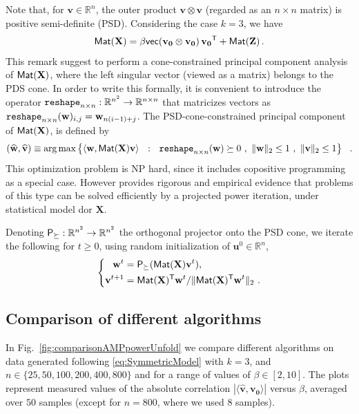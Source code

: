 \documentclass[11pt]{article}
\theoremstyle{definition}
\def\<{\langle}
\def\>{\rangle}
\def\reals{\mathbb{R}}
\def\sT{{\sf T}}
\def\bu{\mathbf{u}}
\def\bv{\mathbf{v}}
\def\hbv{\mathbf{\widehat{v}}}
\def\bw{\mathbf{w}}
\def\hbw{\widehat{\mathbf{w}}}
\def\bvz{\mathbf{v_0}}
\def\bX{\mathbf{X}}
\def\vec{{\sf{vec}}}
\def\bZ{\mathbf{Z}}
\def\M{{\sf Mat}}
\def\P{{\sf P}_\succeq}
\begin{document}
Note that, for $\bv\in\reals^n$, the outer product $\bv \otimes \bv$
(regarded as an $n\times n$ matrix) is positive semi-definite (PSD). 
Considering the case $k=3$, we have
%
\begin{align}
%
\M(\bX) = \beta\vec(\bvz\otimes\bvz)\, \bvz^{\sT} + \M(\bZ)\, .
%
\end{align}
%
This remark suggest to perform a cone-constrained principal component 
analysis of $\M(\bX)$, where the left singular vector (viewed as a
matrix) belongs to the PDS cone.
In order to write this formally, it is convenient to introduce
the operator ${\tt reshape}_{n\times n} : \reals^{n^2} \to \reals^{n
  \times n} $ that matricizes vectors as ${\tt reshape}_{n\times
  n}(\bw)_{i,j} = \bw_{n(i-1) + j}$. The PSD-cone-constrained
principal component of $\M(\bX)$, is defined by 
%
\begin{align}\label{eq:defCCPrincComp}
%
(\hbw,\hbv) \equiv \arg \max \left \{ \< \bw, \M(\bX) \bv \> ~~:~~ {\tt
    reshape}_{n\times n}(\bw)  \succeq 0~,~\|\bw\|_2\leq 1~,~\|\bv\|_2
  \leq 1 \right \}~~.
%
\end{align}
%
This optimization problem is NP hard, since it includes copositive
programming as a special case. However
\cite{deshpande14coneconstrained} provides rigorous and empirical
evidence that problems of this type can be solved efficiently by
a projected power iteration, under statistical model dor $\bX$.

 Denoting $\P : \reals^{n^2} \to \reals^{n^2}$ the orthogonal
 projector  onto the PSD cone,  we iterate the following for $t\ge 0$, using random initialization
 of $\bu^0 \in \reals^n$, 
%
\begin{align}\label{eq:coneConstrained}
\left \{  \begin{aligned}\bw^{t}  & = \P(\M(\bX) \bv^t)  ,\\
\bv^{t+1} &= \M(\bX)^\sT\bw^{t} / \|\M(\bX)^\sT\bw^{t} \|_2  ~. \end{aligned} \right .
\end{align}
%


\subsection{Comparison of different algorithms}
\label{sec:NumericalComparison}

In Fig.~\ref{fig:comparisonAMPpowerUnfold}  we compare different
algorithms on data generated
following \ref{eq:SymmetricModel} with $k=3$, and $n \in \{25,50,100,200,400,800\}$
and for a range of values of $\beta \in[2,10]$. 
The plots represent
measured values of the absolute correlation $|\<\hbv,\bvz\>|$ versus
$\beta$, averaged over $50$ samples (except for $n=800$, where we used
$8$ samples). 
\end{document}
